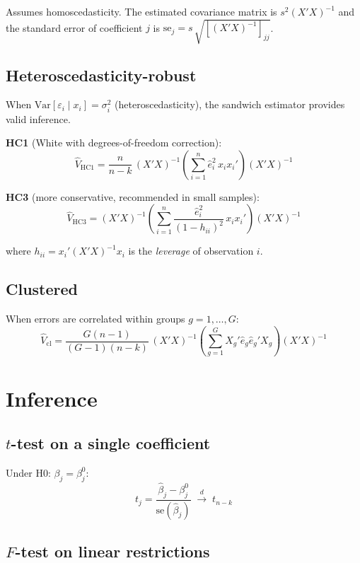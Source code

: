Assumes homoscedasticity. The estimated covariance matrix is
$s^2(X'X)^{-1}$ and the standard error of coefficient $j$ is
$\mathrm{se}_j = s\,\sqrt{[(X'X)^{-1}]_{jj}}$.

\subsection*{Heteroscedasticity-robust}

When $\mathrm{Var}[\varepsilon_i \mid x_i] = \sigma_i^2$ (heteroscedasticity),
the sandwich estimator provides valid inference.

\textbf{HC1} (White with degrees-of-freedom correction):
\[
  \hat{V}_{\mathrm{HC1}} = \frac{n}{n-k}\,(X'X)^{-1}
    \!\left(\sum_{i=1}^{n} \hat{e}_i^2\, x_i x_i'\right)\!(X'X)^{-1}
\]

\textbf{HC3} (more conservative, recommended in small samples):
\[
  \hat{V}_{\mathrm{HC3}} = (X'X)^{-1}
    \!\left(\sum_{i=1}^{n} \frac{\hat{e}_i^2}{(1 - h_{ii})^2}\, x_i x_i'\right)\!(X'X)^{-1}
\]

where $h_{ii} = x_i'(X'X)^{-1}x_i$ is the \emph{leverage} of observation $i$.

\subsection*{Clustered}

When errors are correlated within groups $g = 1,\ldots,G$:
\[
  \hat{V}_{\mathrm{cl}} = \frac{G(n-1)}{(G-1)(n-k)}\,
    (X'X)^{-1}\!\left(\sum_{g=1}^{G} X_g'\hat{e}_g\hat{e}_g'X_g\right)\!(X'X)^{-1}
\]

\section{Inference}

\subsection*{$t$-test on a single coefficient}

Under H0: $\beta_j = \beta_j^0$:
\[
  t_j = \frac{\hat{\beta}_j - \beta_j^0}{\mathrm{se}(\hat{\beta}_j)}
  \;\xrightarrow{d}\; t_{n-k}
\]

\subsection*{$F$-test on linear restrictions}

